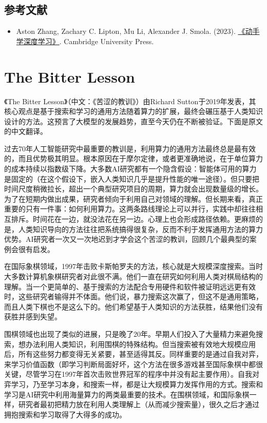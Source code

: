 \hypertarget{ux53c2ux8003ux6587ux732e-3}{%
\subsection{参考文献}\label{ux53c2ux8003ux6587ux732e-3}}

\begin{itemize}
\tightlist
\item
  Aston Zhang, Zachary C. Lipton, Mu Li, Alexander J. Smola. (2023). \href{https://zh.d2l.ai/}{《动手学深度学习》}. Cambridge University Press.
\end{itemize}

\clearpage

\hypertarget{the-bitter-lesson}{%
\section{The Bitter Lesson}\label{the-bitter-lesson}}

《The Bitter Lesson》（中文：《苦涩的教训》）由Richard Sutton于2019年发表，其核心观点是基于搜索和学习的通用方法随着算力的扩展，最终会碾压基于人类知识设计的方法。这预言了大模型的发展趋势，直至今天仍在不断被验证。下面是原文的中文翻译。

过去70年人工智能研究中最重要的教训是，利用算力的通用方法最终总是最有效的，而且优势极其明显。根本原因在于摩尔定律，或者更准确地说，在于单位算力的成本持续以指数级下降。大多数AI研究都有一个隐含假设：智能体可用的算力是固定的（在这个假设下，嵌入人类知识几乎是提升性能的唯一途径）。但只要把时间尺度稍微拉长，超出一个典型研究项目的周期，算力就会出现数量级的增长。为了在短期内做出成果，研究者倾向于利用自己对领域的理解。但长期来看，真正重要的只有一件事：如何利用算力。这两条路线理论上可以并行，实践中却往往相互排斥。时间花在一边，就没法花在另一边。心理上也会形成路径依赖。更麻烦的是，人类知识导向的方法往往把系统搞得很复杂，反而不利于发挥通用方法的算力优势。AI研究者一次又一次地迟到才学会这个苦涩的教训，回顾几个最典型的案例会很有启发。

在国际象棋领域，1997年击败卡斯帕罗夫的方法，核心就是大规模深度搜索。当时大多数计算机象棋研究者对此很不满。他们一直在研究如何利用人类对棋局结构的理解。当一个更简单的、基于搜索的方法配合专用硬件和软件被证明远远更有效时，这些研究者输得并不体面。他们说，暴力搜索这次赢了，但这不是通用策略，而且人类下棋也不是这么下的。他们希望基于人类知识的方法获胜，结果他们没有获胜并感到失望。

围棋领域也出现了类似的进展，只是晚了20年。早期人们投入了大量精力来避免搜索，想办法利用人类知识，利用围棋的特殊结构。但当搜索被有效地大规模应用后，所有这些努力都变得无关紧要，甚至适得其反。同样重要的是通过自我对弈，来学习价值函数（即学习判断局面好坏，这个方法在很多游戏甚至国际象棋中都很关键，尽管学习在1997年首次击败世界冠军的程序中并没有起主要作用）。自我对弈学习，乃至学习本身，和搜索一样，都是让大规模算力发挥作用的方式。搜索和学习是AI研究中利用海量算力的两类最重要的技术。在围棋领域，和国际象棋一样，研究者最初把精力放在利用人类理解上（从而减少搜索量），很久之后才通过拥抱搜索和学习取得了大得多的成功。

